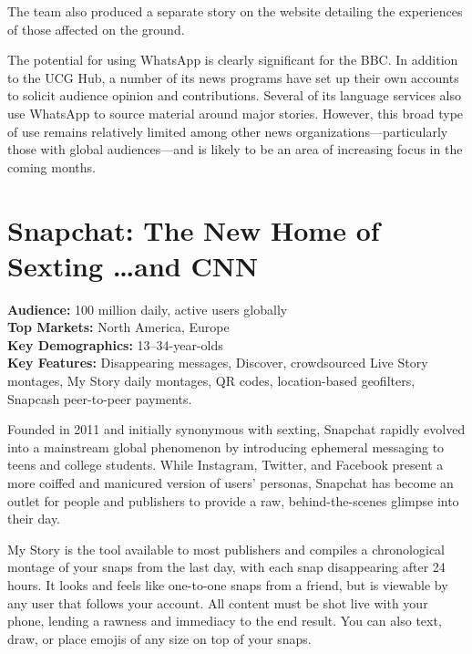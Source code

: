\documentclass[notoc, symmetric, nobib, nols]{towcenter-guideto-book}
\begin{document}
The team also produced a separate story on the website detailing the experiences of those affected on the ground.\autocite{BBCNepal}


The potential for using WhatsApp is clearly significant for the BBC. In addition to the UCG Hub, a number of its news programs have set up their own accounts to solicit audience opinion and contributions. Several of its language services also use WhatsApp to source material around major stories. However, this broad type of use remains relatively limited among other news organizations---particularly those with global audiences---and is likely to be an area of increasing focus in the coming months.

\newpage
\section{Snapchat: The New Home of Sexting \ldots and CNN} 

\begin{framed}
\noindent\textbf{Audience:} 100 million daily, active users globally\\
\noindent\textbf{Top Markets:} North America, Europe\\
\noindent\textbf{Key Demographics:} 13--34-year-olds\\
\noindent\textbf{Key Features:} Disappearing messages, Discover, crowdsourced Live Story montages, My Story daily montages, QR codes, location-based geofilters, Snapcash peer-to-peer payments.
\end{framed}
\vspace{\baselineskip}
Founded in 2011 and initially synonymous with sexting,\autocite{FCSnapchat} Snapchat rapidly evolved into a mainstream global phenomenon by introducing ephemeral messaging to teens and college students.  While Instagram, Twitter, and Facebook present a more coiffed and manicured version of users' personas, Snapchat has become an outlet for people and publishers to provide a raw, behind-the-scenes glimpse into their day.

My Story is the tool available to most publishers and compiles a chronological montage of your snaps from the last day, with each snap disappearing after 24 hours. It looks and feels like one-to-one snaps from a friend, but is viewable by any user that follows your account. All content must be shot live with your phone, lending a rawness and immediacy to the end result. You can also text, draw, or place emojis of any size on top of your snaps.
\end{document}
